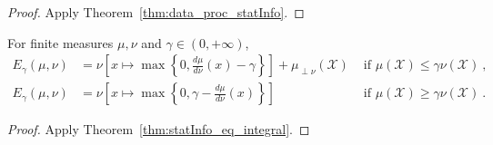 \begin{proof}%
{}
Apply Theorem~\ref{thm:data_proc_statInfo}.
\end{proof}

\begin{lemma}
  \label{lem:eGamma_eq_integral}
  For finite measures $\mu, \nu$ and $\gamma \in (0,+\infty)$,
  \begin{align*}
  E_\gamma(\mu, \nu)
  &= \nu\left[ x \mapsto \max \left\{0 , \frac{d \mu}{d\nu}(x) - \gamma \right\} \right] + \mu_{\perp \nu}(\mathcal X) & \text{ if } \mu(\mathcal X) \le \gamma \nu(\mathcal X)
  \: , \\
  E_\gamma(\mu, \nu)
  &= \nu\left[ x \mapsto \max \left\{0 , \gamma - \frac{d \mu}{d\nu}(x) \right\} \right] & \text{ if } \mu(\mathcal X) \ge \gamma \nu(\mathcal X)
  \: .
  \end{align*}
\end{lemma}

\begin{proof}%
{}
Apply Theorem~\ref{thm:statInfo_eq_integral}.
\end{proof}